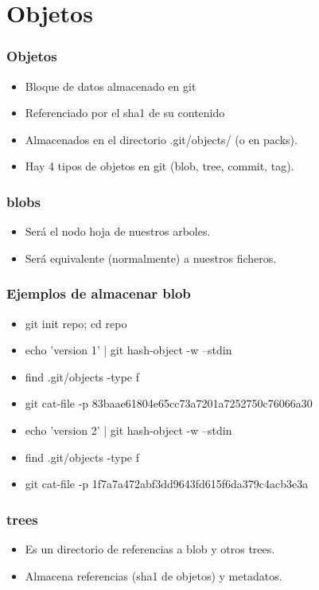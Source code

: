 \documentclass[10pt]{beamer}
\begin{document}
  \section*{Objetos}

  \begin{frame}
    \frametitle{Objetos}
    \begin{itemize}
        \item Bloque de datos almacenado en git
        \item Referenciado por el sha1 de su contenido
        \item Almacenados en el directorio .git/objects/ (o en packs).
        \item Hay 4 tipos de objetos en git (blob, tree, commit, tag).
    \end{itemize}
  \end{frame}

  \begin{frame}
    \frametitle{blobs}
    \begin{itemize}
        \item Será el nodo hoja de nuestros arboles.
        \item Será equivalente (normalmente) a nuestros ficheros.
    \end{itemize}
  \end{frame}

  \begin{frame}
    \frametitle{Ejemplos de almacenar blob}
    \begin{itemize}
        \item git init repo; cd repo
        \item echo 'version 1' | git hash-object -w --stdin
        \item find .git/objects -type f
        \item git cat-file -p 83baae61804e65cc73a7201a7252750c76066a30
        \item echo 'version 2' | git hash-object -w --stdin
        \item find .git/objects -type f
        \item git cat-file -p 1f7a7a472abf3dd9643fd615f6da379c4acb3e3a
    \end{itemize}
  \end{frame}

  \begin{frame}
    \frametitle{trees}
    \begin{itemize}
        \item Es un directorio de referencias a blob y otros trees.
        \item Almacena referencias (sha1 de objetos) y metadatos.
    \end{itemize}
  \end{frame}
\end{document}
